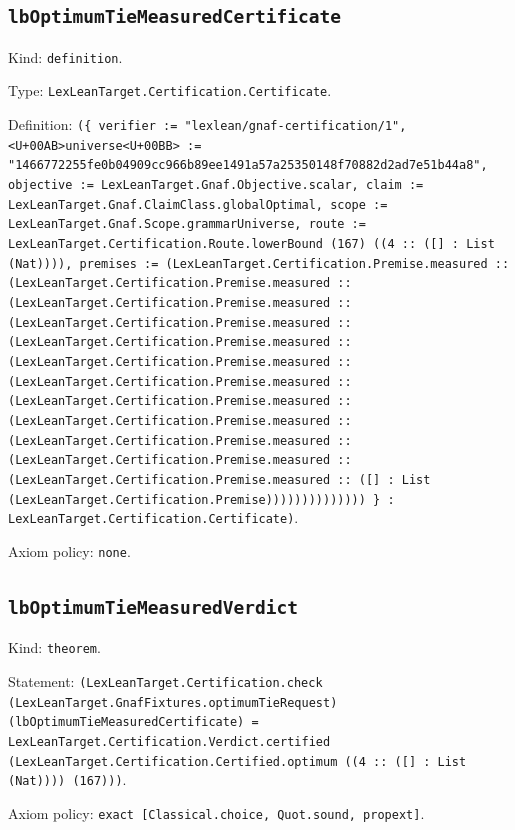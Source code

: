 \documentclass[11pt]{article}
\begin{document}
\subsection*{\texttt{lbOptimumTieMeasuredCertificate}}
\noindent Kind: \texttt{definition}.\par
\noindent Type: \texttt{LexLeanTarget.Certification.Certificate}.\par
\noindent Definition: \texttt{(\{ verifier := "lexlean/gnaf-certification/1", <U+00AB>universe<U+00BB> := "1466772255fe0b04909cc966b89ee1491a57a25350148f70882d2ad7e51b44a8", objective := LexLeanTarget.Gnaf.Objective.scalar, claim := LexLeanTarget.Gnaf.ClaimClass.globalOptimal, scope := LexLeanTarget.Gnaf.Scope.grammarUniverse, route := LexLeanTarget.Certification.Route.lowerBound (167) ((4 :: ([] : List (Nat)))), premises := (LexLeanTarget.Certification.Premise.measured :: (LexLeanTarget.Certification.Premise.measured :: (LexLeanTarget.Certification.Premise.measured :: (LexLeanTarget.Certification.Premise.measured :: (LexLeanTarget.Certification.Premise.measured :: (LexLeanTarget.Certification.Premise.measured :: (LexLeanTarget.Certification.Premise.measured :: (LexLeanTarget.Certification.Premise.measured :: (LexLeanTarget.Certification.Premise.measured :: (LexLeanTarget.Certification.Premise.measured :: (LexLeanTarget.Certification.Premise.measured :: (LexLeanTarget.Certification.Premise.measured :: ([] : List (LexLeanTarget.Certification.Premise)))))))))))))) \} : LexLeanTarget.Certification.Certificate)}.\par
\noindent Axiom policy: \texttt{none}.\par
\subsection*{\texttt{lbOptimumTieMeasuredVerdict}}
\noindent Kind: \texttt{theorem}.\par
\noindent Statement: \texttt{(LexLeanTarget.Certification.check (LexLeanTarget.GnafFixtures.optimumTieRequest) (lbOptimumTieMeasuredCertificate) = LexLeanTarget.Certification.Verdict.certified (LexLeanTarget.Certification.Certified.optimum ((4 :: ([] : List (Nat)))) (167)))}.\par
\noindent Axiom policy: \texttt{exact [Classical.choice, Quot.sound, propext]}.\par
\end{document}
